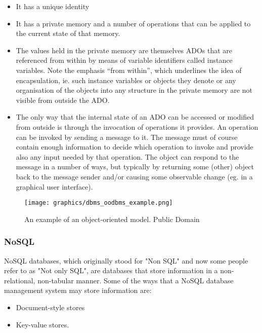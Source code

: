 \documentclass[letterpaper, 12pt]{article}
\begin{document}
\begin{itemize}
  \item It has a unique identity
  \item It has a private memory and a number of operations that can be applied to the current state of that memory.
  \item The values held in the private memory are themselves ADOs that are referenced from
within by means of variable identifiers called instance variables. Note the emphasis
“from within”, which underlines the idea of encapsulation, ie. such instance variables
or objects they denote or any organisation of the objects into any structure in the
private memory are not visible from outside the ADO.
  \item The only way that the internal state of an ADO can be accessed or modified from
outside is through the invocation of operations it provides. An operation can be
invoked by sending a message to it. The message must of course contain enough
information to decide which operation to invoke and provide also any input needed
by that operation. The object can respond to the message in a number of ways, but
typically by returning some (other) object back to the message sender and/or causing
some observable change (eg. in a graphical user interface).
\end{itemize} \cite{object_oriented_data_model}
\par\vspace{\baselineskip}
\begin{figure}
  \centering
  \texttt{[image: graphics/dbms\_oodbms\_example.png]}
  \caption{An example of an object-oriented model. Public Domain \cite{wikiObjectOrientedDBMS}}
  \label{fig:ooDBMS_structure}
\end{figure}

\subsubsection{NoSQL}
NoSQL databases, which originally stood for "Non SQL" and now some people refer to as
"Not only SQL", are databases that store information in a non-relational, non-tabular
manner. Some of the ways that a NoSQL database management system may store information are:

\begin{itemize}
  \item Document-style stores
  \item Key-value stores.
\end{itemize}
\end{document}
